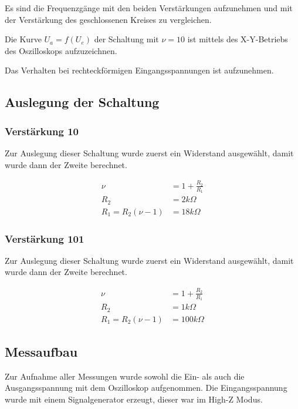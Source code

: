 Es sind die Frequenzgänge mit den beiden Verstärkungen aufzunehmen und mit der Verstärkung des geschlossenen Kreises zu vergleichen.

Die Kurve $U_a = f(U_e)$ der Schaltung mit $\nu=10$ ist mittels des X-Y-Betriebs des Oszilloskops aufzuzeichnen.

Das Verhalten bei rechteckförmigen Eingangsspannungen ist aufzunehmen.


\subsection{Auslegung der Schaltung}
\subsubsection{Verstärkung 10}
Zur Auslegung dieser Schaltung wurde zuerst ein Widerstand ausgewählt, damit wurde dann der Zweite berechnet.

\begin{align}
    \nu &= 1+ \frac{R_2}{R_1}\\
    R_2 &= 2k\Omega\\
    R_1 = R_2(\nu - 1) &= 18 k\Omega
\end{align}

\subsubsection{Verstärkung 101}
Zur Auslegung dieser Schaltung wurde zuerst ein Widerstand ausgewählt, damit wurde dann der Zweite berechnet.

\begin{align}
    \nu &= 1+ \frac{R_2}{R_1}\\
    R_2 &= 1k\Omega\\
    R_1 = R_2(\nu - 1) &= 100 k\Omega
\end{align}

\subsection{Messaufbau}
Zur Aufnahme aller Messungen wurde sowohl die Ein- als auch die Ausgangsspannung mit dem Oszilloskop aufgenommen. Die Eingangsspannung wurde mit einem Signalgenerator erzeugt, dieser war im High-Z Modus. 


